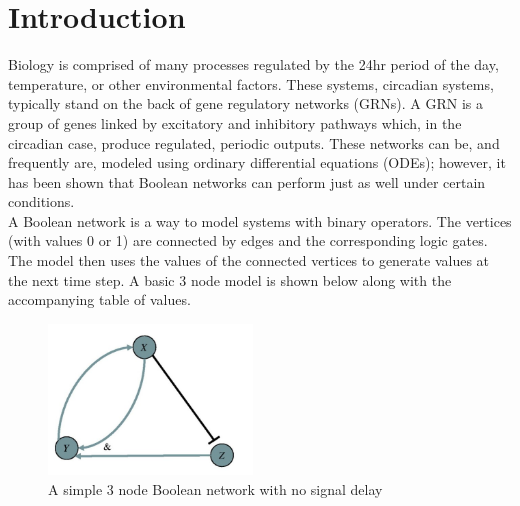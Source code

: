 \documentclass[twoside,twocolumn,9pt]{article}
\begin{document}




\section{Introduction}

Biology is comprised of many processes regulated by the 24hr period of the day, temperature, or other environmental factors. These systems, circadian systems, typically stand on the back of gene regulatory networks (GRNs). A GRN is a group of genes linked by excitatory and inhibitory pathways which, in the circadian case, produce regulated, periodic outputs. These networks can be, and frequently are, modeled using ordinary differential equations (ODEs); however, it has been shown that Boolean networks can perform just as well under certain conditions\cite{digiclocks}.\\
A Boolean network is a way to model systems with binary operators. The vertices (with values 0 or 1) are connected by edges and the corresponding logic gates. The model then uses the values of the connected vertices to generate values at the next time step. A basic 3 node model is shown below along with the accompanying table of values.\\

\begin{figure}[h]
\centering
  \includegraphics[height=4cm]{basicbool}
  \caption{A simple 3 node Boolean network with no signal delay}
  \label{fgr:example}
\end{figure}
\end{document}
